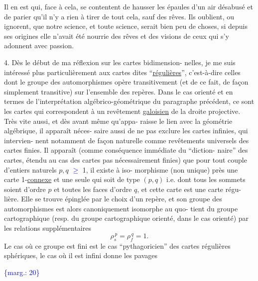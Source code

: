 \documentclass[11pt]{article}
\newcommand{\scanpage}[1]{\par\bigskip\noindent{\small\sffamily[scan #1]}\par}
\newcommand{\mspage}[1]{{\small\sffamily[p.\,#1]}}
\newcommand{\hand}[1]{\textcolor{blue}{#1}}
\newcommand{\margin}[1]{\textcolor{blue}{\{\textsf{marg.:} #1\}}}
\newcommand{\uline}[1]{\underline{#1}}
\begin{document}
Il en est qui, face à cela, se contentent de hausser les
épaules d'un air  désabusé et de parier qu'il n'y a rien à tirer
de tout cela, sauf des rêves. Ils oublient, ou ignorent, que notre
science, et toute science, serait bien peu  de choses, si depuis
ses origines elle n'avait été nourrie des rêves et des visions
de ceux qui s'y adonnent avec passion.

4.        Dès le début de ma réflexion sur les cartes bidimension-%
nelles, je me suis intéressé plus particulièrement aux cartes dites
``\uline{régulières}'', c'est-à-dire celles dont le groupe des automorphismes
opère transitivement (et de ce fait, de façon simplement transitive)
sur l'ensemble des repères. Dans le cas orienté et en termes de
l'interprétation algébrico-géométrique du paragraphe précédent,
ce sont les cartes qui correspondent à un revêtement \uline{galoisien} de
la droite projective. Très vite aussi, et dès avant même qu'appa-%
raisse le lien avec la géométrie algébrique, il apparaît néces-%
saire aussi de ne pas exclure les cartes infinies, qui intervien-%
nent notamment de façon naturelle comme revêtements universels des
cartes finies. Il apparaît (comme conséquence immédiate du ``diction-%
naire'' des cartes, étendu au cas des cartes pas nécessairement finies)
que pour tout couple d'entiers naturels  $p, q$ \hand{$\geq$} 1, il existe à iso-%
morphisme (non unique) près une carte 1-\uline{connexe} et une seule qui
soit de type  $(p,q)$  i.e. dont tous les sommets soient d'ordre  $p$
et toutes les faces d'ordre  $q$, et cette carte est une carte régu-%
lière. Elle se trouve épinglée par le choix d'un repère, et son
groupe des automorphismes est alors canoniquement isomorphe au quo-%
tient du groupe cartographique (resp. du groupe cartographique
orienté, dans le cas orienté) par les relations supplémentaires
\[ \rho_s^{\,p} = \rho_f^{\,q} = 1. \]
Le cas où ce groupe est fini est le cas ``pythagoricien'' des cartes
régulières sphériques, le cas où il est infini donne les pavages

\margin{20}

\clearpage
\scanpage{119/21}
\mspage{19}
\end{document}
